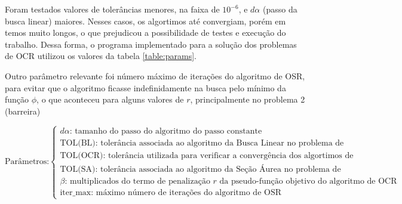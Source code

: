 \documentclass[10pt, a4paper]{article}
\begin{document}
Foram testados valores de toler\^ancias menores, na faixa de $10^{-6}$, e $d\alpha$ (passo da busca linear) maiores. Nesses casos, os algortimos at\'e convergiam, por\'em em temos muito longos, o que prejudicou a possibilidade de testes e execu\c c\~ao do trabalho. Dessa forma, o programa implementado para a solu\c c\~ao dos problemas de OCR utilizou os valores da tabela \ref{table:params}.

Outro par\^ametro relevante foi n\'umero m\'aximo de itera\c c\~oes do algoritmo de OSR, para evitar que o algoritmo ficasse indefinidamente na busca pelo m\'inimo da fun\c c\~ao $\phi$, o que aconteceu para alguns valores de $r$, principalmente no problema 2 (barreira)

\small
$$
\text{Par\^ametros:} \begin{cases}
      \text{$d\alpha$:  tamanho do passo do algoritmo do passo constante}\\
      \text{TOL(BL):    toler\^ancia associada ao algoritmo da Busca Linear no problema de OSR}\\
      \text{TOL(OCR):   toler\^ancia utilizada para verificar a converg\^encia dos algortimos de OCR}\\
      \text{TOL(SA):    toler\^ancia associada ao algoritmo da Se\c c\~ao \'Aurea no problema de OSR}\\
      \text{$\beta$:    multiplicados do termo de penaliza\c c\~ao $r$ da pseudo-fun\c c\~ao objetivo do algoritmo de OCR}\\
      \text{iter\_max:  m\'aximo n\'umero de itera\c c\~oes do algoritmo de OSR}
\end{cases}
$$
\normalsize
\end{document}
